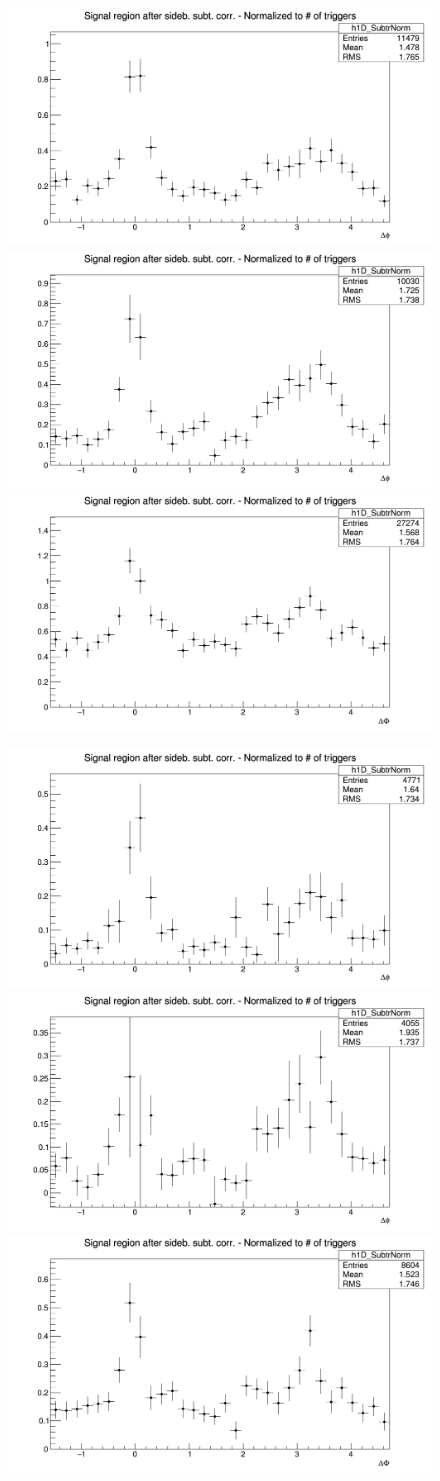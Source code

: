 \begin{figure}[!htbp]
{\includegraphics[width=0.31\linewidth, height=0.23\linewidth]{figures/Dzero/AzimCorrDistr_Dzero_Canvas_PtIntBins9to11_PoolInt_thr2dotto99dot.png}}
{\includegraphics[width=0.31\linewidth, height=0.23\linewidth]{figures/DplusPlotsweff/AzimCorrDistr_Dplus_Canvas_PtIntBins8to12_PoolInt_thr2dotto99dot.png}}
{\includegraphics[width=0.31\linewidth, height=0.23\linewidth]{figures/Dstar_wEFF/AzimCorrDistr_Dstar_Canvas_PtIntBins7to9_PoolInt_thr2dotto99dot.png}}

{\includegraphics[width=0.31\linewidth, height=0.23\linewidth]{figures/Dzero/AzimCorrDistr_Dzero_Canvas_PtIntBins9to11_PoolInt_thr3dotto99dot.png}}
{\includegraphics[width=0.31\linewidth, height=0.23\linewidth]{figures/DplusPlotsweff/AzimCorrDistr_Dplus_Canvas_PtIntBins8to12_PoolInt_thr3dotto99dot.png}}
{\includegraphics[width=0.31\linewidth, height=0.23\linewidth]{figures/Dstar_wEFF/AzimCorrDistr_Dstar_Canvas_PtIntBins7to9_PoolInt_thr3dotto99dot.png}}


\end{figure}
